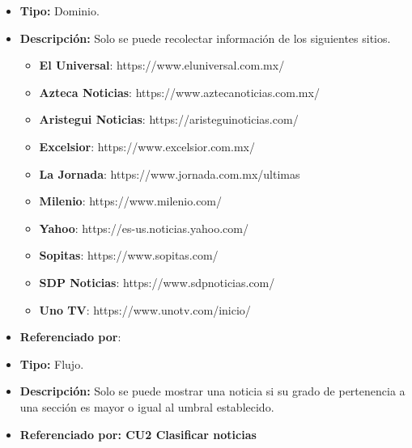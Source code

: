 \begin{itemize}
  \item \textbf{Tipo:} Dominio.
  \item \textbf{Descripción:} Solo se puede recolectar información de los siguientes sitios.\\

  \begin{itemize}

    \item \textbf{El Universal}: https://www.eluniversal.com.mx/
    \item \textbf{Azteca Noticias}: https://www.aztecanoticias.com.mx/
    \item \textbf{Aristegui Noticias}: https://aristeguinoticias.com/
    \item \textbf{Excelsior}: https://www.excelsior.com.mx/
    \item \textbf{La Jornada}: https://www.jornada.com.mx/ultimas
    \item \textbf{Milenio}: https://www.milenio.com/
    \item \textbf{Yahoo}: https://es-us.noticias.yahoo.com/
    \item \textbf{Sopitas}: https://www.sopitas.com/
    \item \textbf{SDP Noticias}: https://www.sdpnoticias.com/
    \item \textbf{Uno TV}: https://www.unotv.com/inicio/

  \end{itemize} 
  \item \textbf{Referenciado por}:  \\
\end{itemize}

\begin{itemize}
  \item \textbf{Tipo:}  Flujo.
  \item \textbf{Descripción:} Solo se puede mostrar una noticia si su grado de pertenencia a una sección
  es mayor o igual al umbral establecido.
  \item \textbf{Referenciado por: CU2 Clasificar noticias}  \\
\end{itemize}


